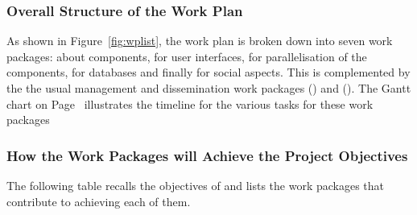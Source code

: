 \documentclass[noworkareas,deliverables,\classoptions]{euproposal}       %
\begin{document}
\begin{proposal}
\subsubsection{Overall Structure of the Work Plan}

As shown in Figure~\ref{fig:wplist}, the work plan is broken down into
seven work packages:  about components,
 for user interfaces,  for parallelisation of the
components,  for databases and finally
 for social aspects. This is complemented by the
the usual management and dissemination work packages
() and (). The Gantt chart on
Page~\pageref{fig:gantt} illustrates the timeline for the various
tasks for these work packages%

\wpfigstyle{\footnotesize\def\tabcolsep{3.5pt}}
{\wpfig}


\subsubsection{How the Work Packages will Achieve the Project Objectives}
\label{sssec:how_the_work_packages_will_achieve}



The following table recalls the objectives of \TheProject and lists
the work packages that contribute to achieving each of them.


\end{proposal}
\end{document}
